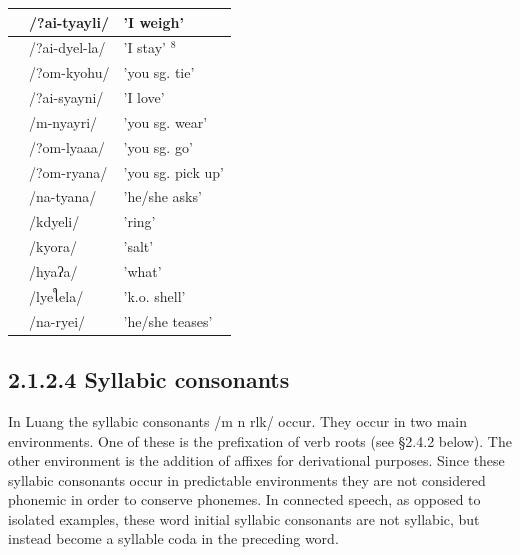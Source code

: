 \documentclass[10pt]{article}
\begin{document}
\begin{center}
\begin{tabular}{|l|l|l|}
\hline
[ \(2 \mathrm{a}^{1} \mathrm{t}^{\mathrm{y}}\) ayli] & /?ai-tyayli/ & 'I weigh' \\
\hline
[ Pai \(^{\text {d }}{ }^{\text {y }}\) cllә] & /?ai-dyel-la/ & 'I stay' \({ }^{8}\) \\
\hline
[?om'k \({ }^{\text {y }}\) ohu] & /?om-kyohu/ & 'you sg. tie' \\
\hline
[?ai's \({ }^{\text {y }}\) ayni] & /?ai-syayni/ & 'I love' \\
\hline
[mn \({ }^{\text {y }}\) ayri] & /m-nyayri/ & 'you sg. wear' \\
\hline
[ ใom'l \({ }^{\text {У }}\) aใә] & /?om-lyaaa/ & 'you sg. go' \\
\hline
[ \(3 \mathrm{om}^{\prime} \mathrm{r}^{\mathrm{y}}\) anə] & /?om-ryana/ & 'you sg. pick up' \\
\hline
['nat \({ }^{\text {y }}\) ana] & /na-tyana/ & 'he/she asks' \\
\hline
['kăd \({ }^{\text {y }}\) eli] & /kdyeli/ & 'ring' \\
\hline
['k \({ }^{\text {y }}\) o? ว] & /kyora/ & 'salt' \\
\hline
['h \({ }^{\text {y }}\) aʔə] & /hyaʔa/ & 'what' \\
\hline
[1 \({ }^{\text {Ye }}\) e'2elə] & /lyeใela/ & 'k.o. shell' \\
\hline
[na'r \({ }^{\text {y }}\) ei] & /na-ryei/ & 'he/she teases' \\
\hline
\end{tabular}
\end{center}

\subsection*{2.1.2.4 Syllabic consonants}
In Luang the syllabic consonants /m n rlk/ occur. They occur in two main environments. One of these is the prefixation of verb roots (see §2.4.2 below). The other environment is the addition of affixes for derivational purposes. Since these syllabic consonants occur in predictable environments they are not considered phonemic in order to conserve phonemes. In connected speech, as opposed to isolated examples, these word initial syllabic consonants are not syllabic, but instead become a syllable coda in the preceding word.
\end{document}

